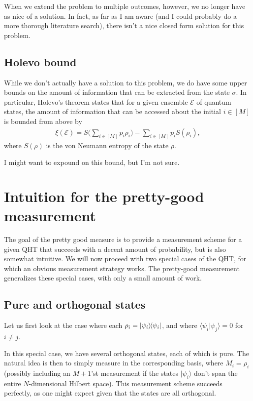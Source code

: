 \documentclass{amsart}
\theoremstyle{plain}
\theoremstyle{remark}
\newcommand{\bra}[1]{\langle{#1}|}
\newcommand{\ket}[1]{|{#1}\rangle}
\newcommand{\braket}[2]{\langle{#1}|{#2}\rangle}
\newcommand{\ketbra}[2]{\ket{#1}\hspace{-1.5pt}\bra{#2}}
\begin{document}
When we extend the problem to multiple outcomes, however, we no longer have as nice of a solution.  In fact, as far as I am aware (and I could probably do a more thorough literature search), there isn't a nice closed form solution for this problem.

\subsection{Holevo bound}

While we don't actually have a solution to this problem, we do have some upper bounds on the amount of information that can be extracted from the state $\sigma$.  In particular, Holevo's theorem states that for a given ensemble $\mathcal{E}$ of quantum states, the amount of information that can be accessed about the initial $i\in[M]$ is bounded from above by
\begin{align}
 \xi(\mathcal{E}) = S\Big( \sum_{i\in[M]} p_i \rho_i\Big) - \sum_{i\in[M]} p_i S(\rho_i),
\end{align}
where $S(\rho)$ is the von Neumann entropy of the state $\rho$.

I might want to expound on this bound, but I'm not sure.

\section{Intuition for the pretty-good measurement}

The goal of the pretty good measure is to provide a measurement scheme for a given QHT that succeeds with a decent amount of probability, but is also somewhat intuitive.  We will now proceed with two special cases of the QHT, for which an obvious measurement strategy works.  The pretty-good measurement generalizes these special cases, with only a small amount of work.

\subsection{Pure and orthogonal states}

Let us first look at the case where each $\rho_i = \ketbra{\psi_i}{\psi_i}$, and where $\braket{\psi_i}{\psi_j} = 0$ for $i\neq j$.  

In this special case, we have several orthogonal states, each of which is pure.  The natural idea is then to simply measure in the corresponding basis, where $M_i = \rho_i$ (possibly including an $M+1$'st measurement if the states $\ket{\psi_i}$ don't span the entire $N$-dimensional Hilbert space).  This measurement scheme succeeds perfectly, as one might expect given that the states are all orthogonal.
\end{document}

